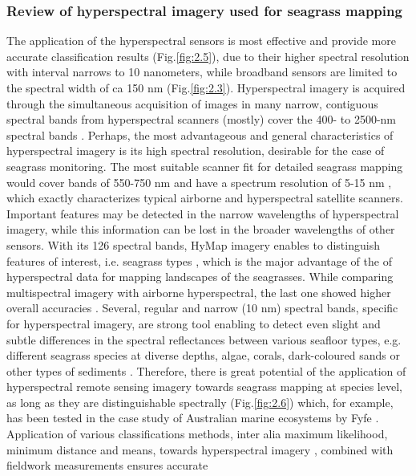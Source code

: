 \documentclass[10pt, a4paper]{article}
\begin{document}
\subsubsection{Review of hyperspectral imagery used for seagrass mapping}
The application of the hyperspectral sensors is most effective and provide more accurate classification
results  (Fig.\ref{fig:2.5}), due to their higher spectral resolution \cite{Bharathi03}\label{Bharathi03} with interval
narrows to 10 nanometers, while broadband sensors are limited to the spectral width of ca
150 nm  (Fig.\ref{fig:2.3}). 
Hyperspectral imagery is acquired through the simultaneous acquisition of images in many
narrow, contiguous spectral bands from hyperspectral scanners (mostly) cover the 400-
to 2500-nm spectral bands \cite{Schmidt03}\label{Schmidt03}.
Perhaps, the most advantageous and general characteristics of hyperspectral imagery is its
high spectral resolution, desirable for the case of seagrass monitoring. 
The most suitable
scanner fit for detailed seagrass mapping would cover bands of 550-750 nm and have a spectrum
resolution of 5-15 nm \cite{Fyfe04}\label{Fyfe04}, which exactly characterizes typical airborne and
hyperspectral satellite scanners. Important features may be detected in the narrow
wavelengths of hyperspectral imagery, while this information can be lost in the broader
wavelengths of other sensors. With its 126 spectral bands, HyMap imagery enables to
distinguish features of interest, i.e. seagrass types \cite{Peneva07}\label{Peneva07}, which is the major
advantage of the of hyperspectral data for mapping landscapes of the seagrasses.
While comparing multispectral imagery with airborne hyperspectral, the last one showed higher
overall accuracies \cite{Phinn08}\label{Phinn08}. Several, regular and narrow (10 nm) spectral bands, specific for
hyperspectral imagery, are strong tool enabling to detect even slight and subtle differences in the
spectral reflectances between various seafloor types, e.g. different seagrass species at diverse depths,
algae, corals, dark-coloured sands or other types of sediments \cite{Hochberg03a}\label{Hochberg03a}. 
Therefore, there is great potential of the application of hyperspectral remote sensing imagery towards seagrass
mapping at species level, as long as they are distinguishable spectrally (Fig.\ref{fig:2.6}) which, for example, has been
tested in the case study of Australian marine ecosystems by Fyfe \cite{Fyfe04}\label{Fyfe04}. Application of various
classifications methods, inter alia maximum likelihood, minimum distance and means, towards
hyperspectral imagery \cite{Peneva08}\label{Peneva08}, combined with fieldwork measurements ensures accurate
\end{document}
